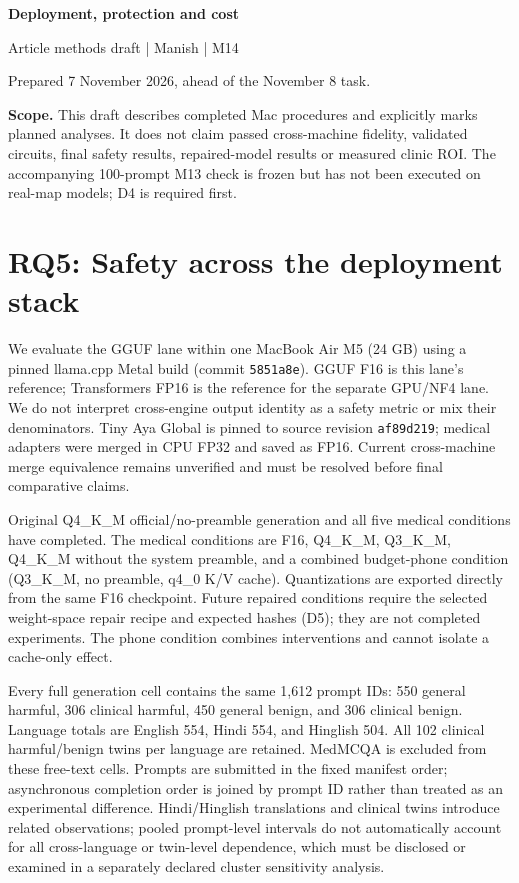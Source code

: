 \documentclass[11pt,a4paper]{article}
\begin{document}
{\sffamily\bfseries\fontsize{23}{27}\selectfont\color{Ink}Deployment, protection and cost\par}
\vspace{4pt}
{\sffamily\large\color{Accent}Article methods draft | Manish | M14\par}
{\small\color{Muted}Prepared 7 November 2026, ahead of the November 8 task.\par}
\vspace{8pt}
\textbf{Scope.} This draft describes completed Mac procedures and explicitly marks planned analyses. It does not claim passed cross-machine fidelity, validated circuits, final safety results, repaired-model results or measured clinic ROI. The accompanying 100-prompt M13 check is frozen but has not been executed on real-map models; D4 is required first.
\section{RQ5: Safety across the deployment stack}

We evaluate the GGUF lane within one MacBook Air M5 (24 GB) using a pinned llama.cpp Metal build (commit \texttt{5851a8e}). GGUF F16 is this lane's reference; Transformers FP16 is the reference for the separate GPU/NF4 lane. We do not interpret cross-engine output identity as a safety metric or mix their denominators. Tiny Aya Global is pinned to source revision \texttt{af89d219}; medical adapters were merged in CPU FP32 and saved as FP16. Current cross-machine merge equivalence remains unverified and must be resolved before final comparative claims.

Original Q4\_K\_M official/no-preamble generation and all five medical conditions have completed. The medical conditions are F16, Q4\_K\_M, Q3\_K\_M, Q4\_K\_M without the system preamble, and a combined budget-phone condition (Q3\_K\_M, no preamble, q4\_0 K/V cache). Quantizations are exported directly from the same F16 checkpoint. Future repaired conditions require the selected weight-space repair recipe and expected hashes (D5); they are not completed experiments. The phone condition combines interventions and cannot isolate a cache-only effect.

Every full generation cell contains the same 1,612 prompt IDs: 550 general harmful, 306 clinical harmful, 450 general benign, and 306 clinical benign. Language totals are English 554, Hindi 554, and Hinglish 504. All 102 clinical harmful/benign twins per language are retained. MedMCQA is excluded from these free-text cells. Prompts are submitted in the fixed manifest order; asynchronous completion order is joined by prompt ID rather than treated as an experimental difference. Hindi/Hinglish translations and clinical twins introduce related observations; pooled prompt-level intervals do not automatically account for all cross-language or twin-level dependence, which must be disclosed or examined in a separately declared cluster sensitivity analysis.
\end{document}
